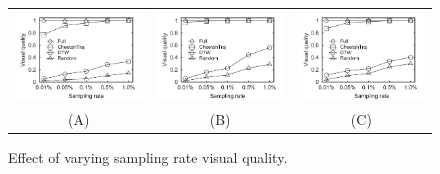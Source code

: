 \begin{figure}
	\centering
	\small
	\begin{tabular}{ccc}
		\includegraphics[width=0.22\linewidth]{pictures/quantitative_study/rate_porto_q}
		&
		\includegraphics[width=0.22\linewidth]{pictures/quantitative_study/rate_sz_q}
        &
		\includegraphics[width=0.22\linewidth]{pictures/quantitative_study/rate_cd_q}
		\\
		(A) \pt{}
		&
		(B) \sz{}
		&
		(C) \cd{}
	\end{tabular}
    \trim
    \vspace{-2mm}
	\caption{Effect of varying sampling rate visual quality.}
	\label{fig:rate_quality}
	\trim \trim
\end{figure}

